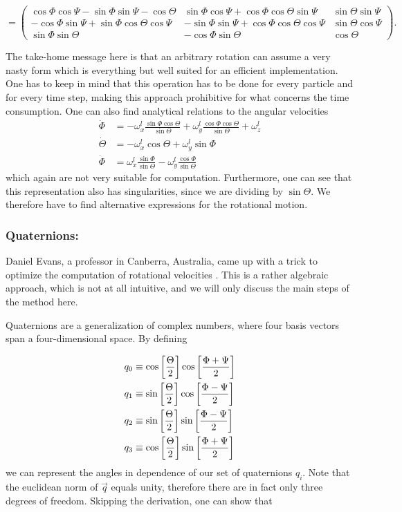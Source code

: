 $$
= 
\begin{pmatrix}
 \cos{\Phi} \cos{\Psi}  -\sin{\Phi}\sin{\Psi}-\cos{\Theta}   & \sin{\Phi}\cos{\Psi} + \cos{\Phi}\cos{\Theta}\sin{\Psi} & \sin{\Theta}\sin{\Psi}\\
 -\cos{\Phi}\sin{\Psi} +\sin{\Phi}\cos{\Theta}\cos{\Psi} & -\sin{\Phi}\sin{\Psi} + \cos{\Phi}\cos{\Theta}\cos{\Psi} & \sin{\Theta}\cos{\Psi} \\
 \sin{\Phi}\sin{\Theta} & -\cos{\Phi}\sin{\Theta} & \cos{\Theta}
\end{pmatrix} .
$$

The take-home message here is that an arbitrary rotation can assume a very nasty form which is everything but well suited for an efficient implementation. One has to keep in mind that this operation has to be done for every particle and for every time step, making this approach prohibitive for what concerns the time consumption. One can also find analytical relations to the angular velocities
\begin{align}
\dot{\Phi} &= -\omega^l_x \frac{\sin{\Phi}\cos{\Theta}}{\sin{\Theta}} + \omega^l_y \frac{\cos{\Phi}\cos{\Theta}}{\sin{\Theta}} + \omega^l_z  \\
\dot{\Theta} &= -\omega^l_x\cos{\Theta} + \omega^l_y \sin{\Phi}  \\
\dot{\Phi} &= \omega^l_x \frac{\sin{\Phi}}{\sin{\Theta}} - \omega^l_y \frac{\cos{\Phi}}{\sin{\Theta}} 
\label{eq:ang_veloc}
\end{align}
which again are not very suitable for computation. Furthermore, one can see that this representation also has singularities, since we are dividing by $\sin{\Theta}$. We therefore have to find alternative expressions for the rotational motion.

\subsubsection*{Quaternions:}
Daniel Evans, a professor in Canberra, Australia, came up with a trick to optimize the computation of rotational velocities \citep{evans1,evans2}. This is a rather algebraic approach, which is not at all intuitive, and we will only discuss the main steps of the method here. 

Quaternions are a generalization of complex numbers, where four basis vectors span a four-dimensional space. By defining

\begin{align}
q_0 &\equiv \text{cos}\left[\frac{\Theta}{2}\right]  \text{cos}\left[\frac{\Phi+\Psi}{2}\right] \\
q_1 &\equiv \text{sin}\left[\frac{\Theta}{2}\right]  \text{cos}\left[\frac{\Phi-\Psi}{2}\right] \\
q_2 &\equiv \text{sin}\left[\frac{\Theta}{2}\right]  \text{sin}\left[\frac{\Phi-\Psi}{2}\right] \\
q_3 &\equiv \text{cos}\left[\frac{\Theta}{2}\right]  \text{sin}\left[\frac{\Phi+\Psi}{2}\right] 
\label{eq:quaternions}
\end{align}
we can represent the angles in dependence of our set of quaternions $q_i$. Note that the euclidean norm of $\vec{q}$ equals unity, therefore there are in fact only three degrees of freedom. Skipping the derivation, one can show that


